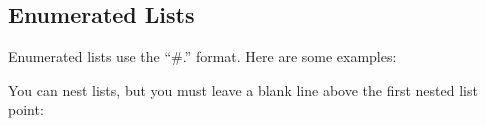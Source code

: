 \documentclass[letterpaper,10pt,english]{sphinxmanual}
\begin{document}
\subsection{Enumerated Lists}
\label{\detokenize{guide/99_rst-guide:enumerated-lists}}
Enumerated lists use the “\#.” format.
Here are some examples:

\begin{sphinxVerbatim}[commandchars=\\\{\}]
  
\end{sphinxVerbatim}

You can nest lists, but you must leave a blank line above the first nested list point:
\end{document}

